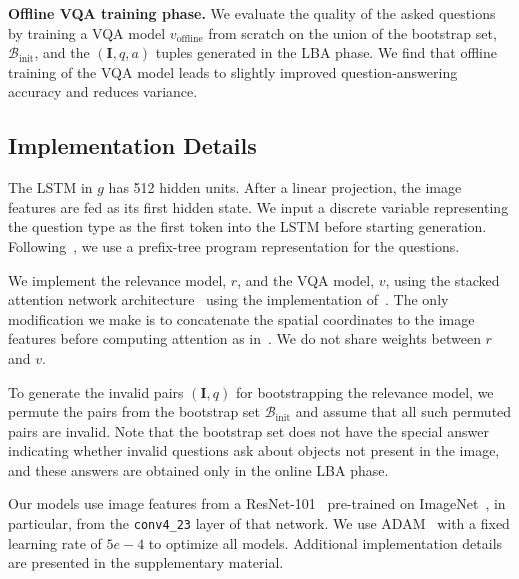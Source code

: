 \documentclass[10pt,twocolumn,letterpaper]{article}
\newcommand{\imageQpair}{(\mathbf{I}, q)}
\newcommand{\imageQApair}{(\mathbf{I}, q, a)}
\newcommand{\voffline}{v_{\mathrm{offline}}}
\newcommand{\bootstrap}{\mathcal{B}_{\mathrm{init}}}
\begin{document}
\par \noindent \textbf{Offline VQA training phase.} We evaluate the quality of the asked questions by training a VQA model $\voffline$ from scratch on the union of the bootstrap set, $\bootstrap$, and the $\imageQApair$ tuples generated in the LBA phase. We find that offline training of the VQA model leads to slightly improved question-answering accuracy and reduces variance.


\subsection{Implementation Details}
\label{sec:implementation}
The LSTM in $g$ has 512 hidden units. After a linear projection, the image features are fed as its first hidden state. We input a discrete variable representing the question type as the first token into the LSTM before starting generation. Following~\cite{johnson17module}, we use a prefix-tree program representation for the questions.

We implement the relevance model, $r$, and the VQA model, $v$, using the stacked attention network architecture~\citep{yang16stacked} using the implementation of~\citep{johnson17module}. The only modification we make is to concatenate the spatial coordinates to the image features before computing attention as in~\citep{santoro17relational}. We do not share weights between $r$ and $v$.

To generate the invalid pairs $\imageQpair$ for bootstrapping the relevance model, we permute the pairs from the bootstrap set $\bootstrap$ and assume that all such permuted pairs are invalid. Note that the bootstrap set does not have the special answer indicating whether invalid questions ask about objects not present in the image, and these answers are obtained only in the online LBA phase.



Our models use image features from a ResNet-101~\cite{he2016deep} pre-trained on ImageNet~\cite{ILSVRC15}, in particular, from the \texttt{conv4\_23} layer of that network. We use ADAM~\cite{kingma2014adam} with a fixed learning rate of $5e\!-\!4$ to optimize all models.
Additional implementation details are presented in the supplementary material.
\end{document}
